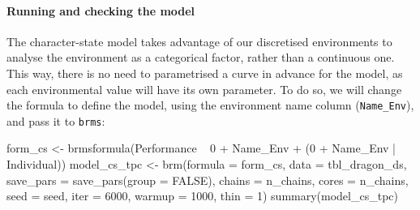 \documentclass[a4paper,12pt,twoside]{article}
\begin{document}
\paragraph{Running and checking the model}
The character-state model takes advantage of our discretised environments to analyse the environment as a categorical factor, rather than a continuous one. This way, there is no need to parametrised a curve in advance for the model, as each environmental value will have its own parameter.
To do so, we will change the formula to define the model, using the environment name column (\texttt{Name\_Env}), and pass it to \texttt{brms}:
\begin{Rinput}
form_cs <- brmsformula(Performance ~ 0 + Name_Env + (0 + Name_Env | Individual))
model_cs_tpc <-
    brm(formula   = form_cs,
        data      = tbl_dragon_ds,
        save_pars = save_pars(group = FALSE),
        chains    = n_chains,
        cores     = n_chains,
        seed      = seed,
        iter      = 6000,
        warmup    = 1000,
        thin      = 1)
summary(model_cs_tpc)
\end{Rinput}
\end{document}
